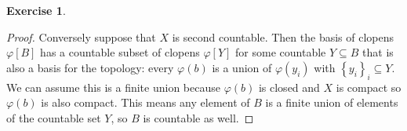 \documentclass{article}
\newcommand{\set}[1]{\left\{#1\right\}}
\theoremstyle{definition}
\newtheorem{question}{Exercise}
\begin{document}
\begin{question}
\begin{enumerate}[a)]
\begin{proof}
                  Conversely suppose that \(X\) is second countable. Then the
                  basis of clopens \(\varphi[B]\) has a countable subset of
                  clopens \(\varphi[Y]\) for some countable \(Y\subseteq B\)
                  that is also a basis for the topology: every \(\varphi(b)\) is
                  a union of \(\varphi(y_{i})\) with \(\set{y_{i}}_{i}\subseteq
                  Y\). We can assume this is a finite union because
                  \(\varphi(b)\) is closed and \(X\) is compact so
                  \(\varphi(b)\) is also compact. This means any element of
                  \(B\) is a finite union of elements of the countable set
                  \(Y\), so \(B\) is countable as well.
              \end{proof}
    \end{enumerate}
\end{question}
\end{document}
